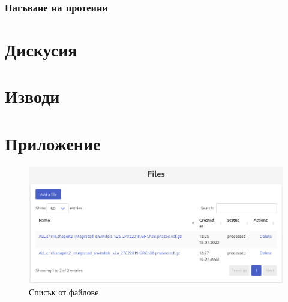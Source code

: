 \documentclass[pdftex,cyrillic,14pt,a4page,twoside,openright]{extreport}
\begin{document}
\subsection{Нагъване на протеини}
\paragraph{}

\chapter{Дискусия}
\paragraph{}


\chapter{Изводи}





\chapter{Приложение}

\begin{figure}[h]
  \centering
  \includegraphics[width=16cm]{figures/list_files}
  \caption {Списък от файлове.}
  \label{fig:list_files}
\end{figure}
\end{document}
